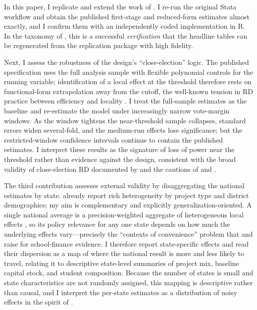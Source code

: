 \documentclass[12pt]{article}
\begin{document}
In this paper, I replicate and extend the work of \citet{biasi_what_2025}. I re-run the original Stata workflow and obtain the published first-stage and reduced-form estimates almost exactly, and I confirm them with an independently coded implementation in R. In the taxonomy of \citet{clemens2017meaning}, this is a successful \emph{verification} that the headline tables can be regenerated from the replication package with high fidelity.

Next, I assess the robustness of the design's ``close-election'' logic. The published specification uses the full analysis sample with flexible polynomial controls for the running variable; identification of a local effect at the threshold therefore rests on functional-form extrapolation away from the cutoff, the well-known tension in RD practice between efficiency and locality \citep{lee_lemieux2010,calonico2014robust,imbens2012optimal}. I treat the full-sample estimates as the baseline and re-estimate the model under increasingly narrow vote-margin windows. As the window tightens the near-threshold sample collapses, standard errors widen several-fold, and the medium-run effects lose significance; but the restricted-window confidence intervals continue to contain the published estimates. I interpret these results as the signature of loss of power near the threshold rather than evidence against the design, consistent with the broad validity of close-election RD documented by \citet{eggers2015validity} and the cautions of \citet{caughey2011elections} and \citet{delacuesta2016misunderstandings}.

The third contribution assesses external validity by disaggregating the national estimates by state. \citet{biasi_what_2025} already report rich heterogeneity by project type and district demographics; my aim is complementary and explicitly generalization-oriented. A single national average is a precision-weighted aggregate of heterogeneous local effects \citep{goodmanbacon2021difference,sunabraham2021estimating,callaway2021difference}, so its policy relevance for any one state depends on how much the underlying effects vary---precisely the ``contexts of convenience'' problem that \citet{handel2024contexts} and \citet{allcott2015site} raise for school-finance evidence. I therefore report state-specific effects and read their dispersion as a map of where the national result is more and less likely to travel, relating it to descriptive state-level summaries of project mix, baseline capital stock, and student composition. Because the number of states is small and state characteristics are not randomly assigned, this mapping is descriptive rather than causal, and I interpret the per-state estimates as a distribution of noisy effects in the spirit of \citet{meager2019understanding}.
\end{document}

